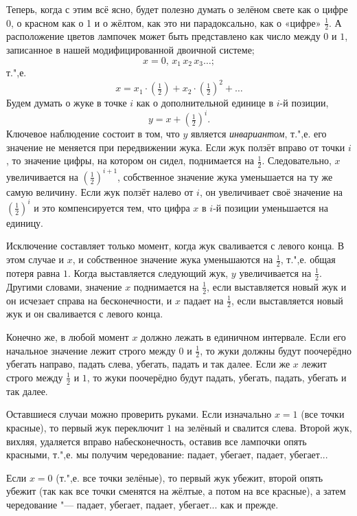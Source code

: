 \documentclass[twoside]{book}
\begin{document}
Теперь, когда с этим всё ясно, будет полезно думать о зелёном свете как о цифре 0, о красном как о 1 и о жёлтом, как это ни парадоксально, как о «цифре» $\tfrac12$.
А расположение цветов лампочек может быть представлено как число между $0$ и $1$, записанное в нашей модифицированной двоичной системе;
\[x = 0{,}\,x_1\,x_2\,x_3\dots;\]
т.",е.
 \[x = x_1\cdot(\tfrac12)+x_2\cdot(\tfrac12)^2+\dots\]
Будем думать о жуке в точке $i$ как о дополнительной единице в $i$-й позиции, 
\[y=x+(\tfrac12)^i.\]
Ключевое наблюдение состоит в том, что $y$ является \emph{инвариантом}, т.",е. его значение не меняется при передвижении жука.
Если жук ползёт вправо от точки $i$, то значение цифры, на котором он сидел, поднимается на $\tfrac12$.
Следовательно, $x$ увеличивается на $(\tfrac12)^{i+1}$,  собственное значение жука уменьшается на ту же самую величину.
Если  жук ползёт налево от $i$, он увеличивает своё значение на $(\tfrac12)^i$ и это компенсируется тем, что цифра  $x$ в $i$-й позиции уменьшается на единицу.

Исключение составляет только момент, когда жук сваливается с левого конца.
В этом случае и $x$, и собственное значение жука уменьшаются на $\tfrac12$, т.",е. общая потеря равна $1$.
Когда выставляется следующий жук, $y$ увеличивается на $\tfrac12$.
Другими словами, значение $x$ поднимается на $\tfrac12$, если выставляется новый жук и он исчезает справа на бесконечности, и $x$ падает на $\tfrac12$, если выставляется новый жук и он сваливается с левого конца.

Конечно же, в любой момент $x$ должно лежать в единичном интервале.
Если его начальное значение лежит строго между $0$ и $\tfrac12$, то жуки должны будут поочерёдно убегать направо, падать слева, убегать, падать и так далее.
Если же $x$ лежит строго между $\tfrac12$ и $1$, то жуки поочерёдно будут падать, убегать, падать, убегать и так далее.

Оставшиеся случаи можно проверить руками.
Если изначально $x = 1$ (все точки красные), то первый жук переключит $1$ на зелёный и свалится слева.
Второй жук, вихляя, удаляется вправо на\pagebreak[3] бесконечность, оставив все лампочки опять красными, т.",е. мы получим чередование: падает, убегает, падает, убегает...

Если $x = 0$ (т.",е. все точки зелёные), то первый жук убежит, второй опять убежит (так как все точки сменятся на жёлтые, а потом на все красные), а затем чередование "--- падает, убегает, падает, убегает... как и прежде.
\end{document}

